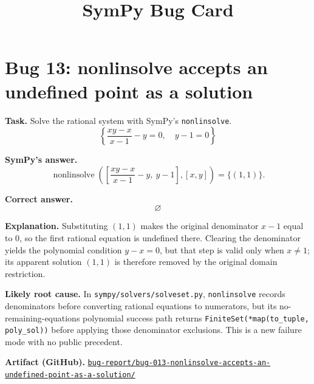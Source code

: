 \documentclass[11pt]{article}
\title{SymPy Bug Card}
\author{}
\date{}
\newcommand{\SymPy}{SymPy}
\newcommand{\artifactrepo}{https://github.com/TODO-org/TODO-repo}
\newcommand{\bugbundle}[1]{\href{\artifactrepo/tree/main/bug-report/#1}{\nolinkurl{bug-report/#1/}}}
\begin{document}
\maketitle

\section*{Bug 13: nonlinsolve accepts an undefined point as a solution}

\begin{counterexamplebox}
\textbf{Task.} Solve the rational system with \SymPy's \texttt{nonlinsolve}.
\[
  \left\{\frac{xy-x}{x-1}-y=0,\quad y-1=0\right\}
\]

\medskip
\textbf{SymPy's answer.}
\[
  \operatorname{nonlinsolve}\!\left(\left[\frac{xy-x}{x-1}-y,\ y-1\right],[x,y]\right)
  = \{(1,1)\}.
\]

\medskip
\textbf{Correct answer.}
\[
  \varnothing
\]

\medskip
\textbf{Explanation.} Substituting \((1,1)\) makes the original denominator \(x-1\) equal to \(0\), so the first rational equation is undefined there.  Clearing the denominator yields the polynomial condition \(y-x=0\), but that step is valid only when \(x\ne1\); its apparent solution \((1,1)\) is therefore removed by the original domain restriction.

\medskip
\textbf{Likely root cause.} In \nolinkurl{sympy/solvers/solveset.py}, \texttt{nonlinsolve} records denominators before converting rational equations to numerators, but its no-remaining-equations polynomial success path returns \texttt{FiniteSet(*map(to\_tuple, poly\_sol))} before applying those denominator exclusions.  This is a new failure mode with no public precedent.

\medskip
\textbf{Artifact (GitHub).} \bugbundle{bug-013-nonlinsolve-accepts-an-undefined-point-as-a-solution}
\end{counterexamplebox}
\end{document}
